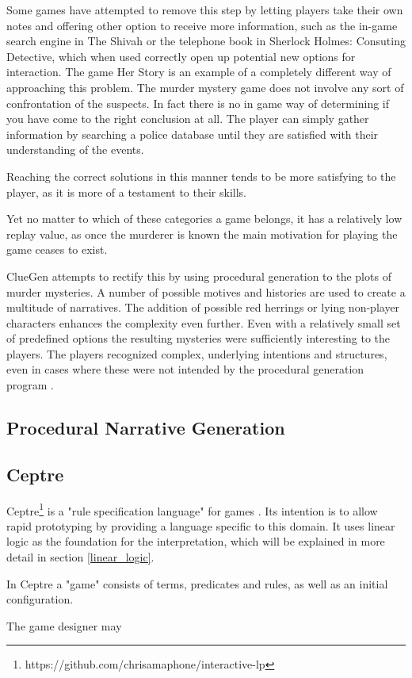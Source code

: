 Some games have attempted to remove this step by letting players take their own notes and offering other option to receive more information, such as the in-game search engine in The Shivah or the telephone book in Sherlock Holmes: Consuting Detective, which when used correctly open up potential new options for interaction.
The game Her Story is an example of a completely different way of approaching this problem.
The murder mystery game does not involve any sort of confrontation of the suspects.
In fact there is no in game way of determining if you have come to the right conclusion at all.
The player can simply gather information by searching a police database until they are satisfied with their understanding of the events.

Reaching the correct solutions in this manner tends to be more satisfying to the player, as it is more of a testament to their skills.

Yet no matter to which of these categories a game belongs, it has a relatively low replay value, as once the murderer is known the main motivation for playing the game ceases to exist.

ClueGen attempts to rectify this by using procedural generation to the plots of murder mysteries.
A number of possible motives and histories are used to create a multitude of narratives.
The addition of possible red herrings or lying non-player characters enhances the complexity even further.
Even with a relatively small set of predefined options the resulting mysteries were sufficiently interesting to the players.
The players recognized complex, underlying intentions and structures, even in cases where these were not intended by the procedural generation program \cite{AIIDE1614070}.

\subsection{Procedural Narrative Generation} 


\subsection{Ceptre} 

Ceptre\footnote{https://github.com/chrisamaphone/interactive-lp} is a "rule specification language" for games \cite{martens_2015}.
Its intention is to allow rapid prototyping by providing a language specific to this domain.
It uses linear logic as the foundation for the interpretation, which will be explained in more detail in section \ref{linear_logic}.

In Ceptre a "game" consists of terms, predicates and rules, as well as an initial configuration.

The game designer may 